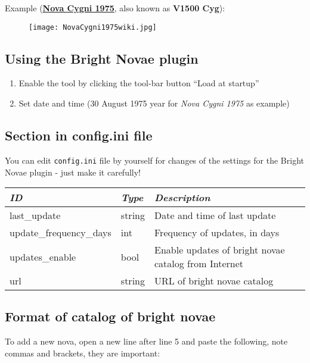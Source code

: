 Example (\href{http://en.wikipedia.org/wiki/V1500_Cygni}{\textbf{Nova
Cygni 1975}}, also known as \textbf{V1500 Cyg}):

\begin{figure}[h]
\centering\texttt{[image: NovaCygni1975wiki.jpg]}
\end{figure}

\subsection{Using the Bright Novae plugin}\label{Using-bright-novae-plugin}

\begin{enumerate}
\item
  Enable the tool by clicking the tool-bar button ``Load at startup''
\item
  Set date and time (30 August 1975 year for \emph{Nova Cygni 1975} as
  example)
\end{enumerate}

\subsection{Section  in config.ini
file}\label{section-novae-in-config.ini-file}

You can edit \texttt{config.ini} file by yourself for changes of the
settings for the Bright Novae plugin - just make it carefully!

\begin{longtabu} to \textwidth {l|l|X}
\toprule
\emph{ID} & \emph{Type} & \emph{Description}\tabularnewline
\midrule
last\_update & string & Date and time of last update\tabularnewline
\midrule
update\_frequency\_days & int & Frequency of updates, in days\tabularnewline
\midrule
updates\_enable & bool & Enable updates of bright novae catalog from Internet \tabularnewline
\midrule
url & string & URL of bright novae catalog \tabularnewline
\bottomrule
\end{longtabu}

\subsection{Format of catalog of bright novae}\label{format-of-catalog-of-bright-novae}

To add a new nova, open a new line after line 5 and paste the following,
note commas and brackets, they are important:

